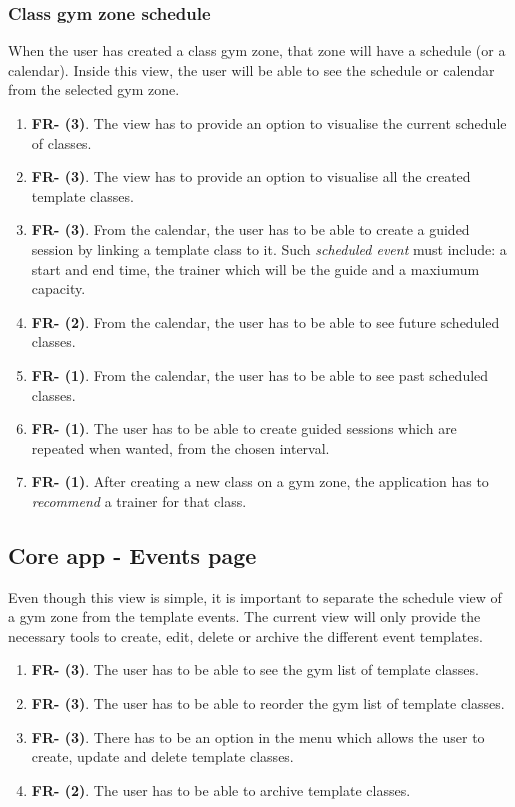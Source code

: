 \documentclass[a4paper, 12pt, oneside]{book}
\begin{document}
\subsubsection{Class gym zone schedule}
When the user has created a class gym zone, that zone will have a schedule (or a calendar). Inside this view, the user will be able to see the schedule or calendar from the selected gym zone.
\begin{enumerate}[label = -]
	\item \textbf{FR- (3)}. The view has to provide an option to visualise the current schedule of classes.
	\item \textbf{FR- (3)}. The view has to provide an option to visualise all the created template classes.
	\item \textbf{FR- (3)}. From the calendar, the user has to be able to create a guided session by linking a template class to it. Such \emph{scheduled event} must include: a start and end time, the trainer which will be the guide and a maxiumum capacity.
	\item \textbf{FR- (2)}. From the calendar, the user has to be able to see future scheduled classes.
	\item \textbf{FR- (1)}. From the calendar, the user has to be able to see past scheduled classes.
	\item \textbf{FR- (1)}. The user has to be able to create guided sessions which are repeated when wanted, from the chosen interval.
	\item \textbf{FR- (1)}. After creating a new class on a gym zone, the application has to \emph{recommend} a trainer for that class.
\end{enumerate}
\subsection{Core app - Events page}
Even though this view is simple, it is important to separate the schedule view of a gym zone from the template events. The current view will only provide the necessary tools to create, edit, delete or archive the different event templates.
\begin{enumerate}[label = -]
	\item \textbf{FR- (3)}. The user has to be able to see the gym list of template classes.
	\item \textbf{FR- (3)}. The user has to be able to reorder the gym list of template classes.
	\item \textbf{FR- (3)}. There has to be an option in the menu which allows the user to create, update and delete template classes.
	\item \textbf{FR- (2)}. The user has to be able to archive template classes.
\end{enumerate}
\end{document}
